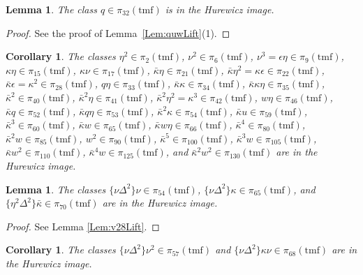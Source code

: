\documentclass[10pt]{amsart}
\newcommand{\tmf}{\mathrm{tmf}}
\newtheorem{cor}[equation]{Corollary}
\newtheorem{lem}[equation]{Lemma}
\theoremstyle{definition}
\numberwithin{equation}{section}
\numberwithin{figure}{section}
\begin{document}
\begin{lem}
The class $q \in \pi_{32}(\tmf)$ is in the Hurewicz image.
\end{lem}

\begin{proof}
See the proof of Lemma~\ref{Lem:quwLift}(1).
\end{proof}

\begin{cor}
The classes $\eta^2 \in \pi_2(\tmf)$, $\nu^2 \in \pi_6(\tmf)$, $\nu^3 = \epsilon \eta \in \pi_9(\tmf)$, $\kappa \eta \in \pi_{15}(\tmf)$, $\kappa \nu \in \pi_{17}(\tmf)$,  $\bar{\kappa}\eta \in \pi_{21}(\tmf)$, $\bar{\kappa} \eta^2 = \kappa \epsilon \in \pi_{22}(\tmf)$, $\bar{\kappa} \epsilon = \kappa^2 \in \pi_{28}(\tmf)$, $q \eta \in \pi_{33}(\tmf)$, $\bar{\kappa} \kappa \in \pi_{34}(\tmf)$, $\bar{\kappa} \kappa \eta \in \pi_{35}(\tmf)$, $\bar{\kappa}^2 \in \pi_{40}(\tmf)$, $\bar{\kappa}^2 \eta \in \pi_{41}(\tmf)$, $\bar{\kappa}^2 \eta^2 = \kappa^3 \in \pi_{42}(\tmf)$, $w \eta \in \pi_{46}(\tmf)$,
$\bar{\kappa} q \in \pi_{52}(\tmf)$, $\bar{\kappa} q \eta \in \pi_{53}(\tmf)$,
 $\bar{\kappa}^2 \kappa \in \pi_{54}(\tmf)$, $\bar{\kappa} u \in \pi_{59}(\tmf)$, $\bar{\kappa}^3 \in \pi_{60}(\tmf)$, $\bar{\kappa} w \in \pi_{65}(\tmf)$, $\bar{\kappa} w \eta \in \pi_{66}(\tmf)$, $\bar{\kappa}^4 \in \pi_{80}(\tmf)$, $\bar{\kappa}^2 w \in \pi_{85}(\tmf)$, $w^2 \in \pi_{90}(\tmf)$, $\bar{\kappa}^5 \in \pi_{100}(\tmf)$, $\bar{\kappa}^3 w \in \pi_{105}(\tmf)$, $\bar{\kappa} w^2 \in \pi_{110}(\tmf)$, $\bar{\kappa}^4 w \in \pi_{125}(\tmf)$, and $\bar{\kappa}^2 w^2 \in \pi_{130}(\tmf)$ are in the Hurewicz image.
\end{cor}

\begin{lem}\label{Lem:v28nu2}
The classes  $\{ \nu \Delta^2 \} \nu \in \pi_{54}(\tmf)$, $\{\nu \Delta^2\} \kappa \in \pi_{65}(\tmf)$, and $\{ \eta^2 \Delta^2\} \bar{\kappa} \in \pi_{70}(\tmf)$ are in the Hurewicz image.
\end{lem}


\begin{proof}
See Lemma \ref{Lem:v28Lift}. 
\end{proof}


\begin{cor}\label{Cor:v28nu2}
The classes $\{ \nu \Delta^2 \} \nu^2 \in \pi_{57}(\tmf)$ and $\{ \nu \Delta^2\} \kappa \nu \in \pi_{68}(\tmf)$ are in the Hurewicz image.
\end{cor}

\end{document}
